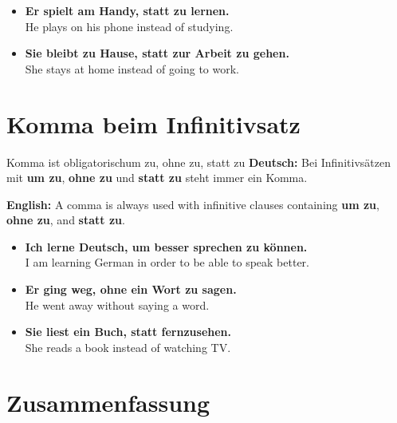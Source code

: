 \documentclass[a4paper,11pt]{article}
\newcommand{\GermanText}[1]{\textbf{Deutsch: }#1\par}
\newcommand{\EnglishText}[1]{{\small\color{SoftGray}\textbf{English: }#1\par}}
\newcommand{\ExampleItem}[2]{\item \textbf{#1}\\{\small\color{SoftGray}#2}}
\begin{document}
        \begin{exbox}
            \begin{itemize}
                \ExampleItem{Er spielt am Handy, statt zu lernen.}{He plays on his phone instead of studying.}
                \ExampleItem{Sie bleibt zu Hause, statt zur Arbeit zu gehen.}{She stays at home instead of going to work.}
            \end{itemize}
        \end{exbox}


    \section{Komma beim Infinitivsatz}

        \begin{grammarentry}{Komma ist obligatorisch}{um zu, ohne zu, statt zu}
            \GermanText{Bei Infinitivsätzen mit \textbf{um zu}, \textbf{ohne zu} und \textbf{statt zu} steht immer ein Komma.}
            \EnglishText{A comma is always used with infinitive clauses containing \textbf{um zu}, \textbf{ohne zu}, and \textbf{statt zu}.}
        \end{grammarentry}

        \begin{exbox}
            \begin{itemize}
                \ExampleItem{Ich lerne Deutsch, um besser sprechen zu können.}{I am learning German in order to be able to speak better.}
                \ExampleItem{Er ging weg, ohne ein Wort zu sagen.}{He went away without saying a word.}
                \ExampleItem{Sie liest ein Buch, statt fernzusehen.}{She reads a book instead of watching TV.}
            \end{itemize}
        \end{exbox}


    \section{Zusammenfassung}
\end{document}
